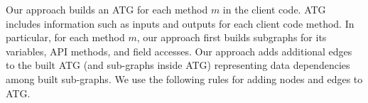 Our approach builds an ATG for each method $m$ in the client code. 
ATG includes information such as inputs 
and outputs for each client code method. In particular, for
each method $m$, our approach first builds subgraphs for its variables,
API methods, and field accesses. Our approach adds additional edges 
to the built ATG (and sub-graphs inside ATG) representing 
data dependencies among built sub-graphs.
We use the following rules for adding nodes and edges to ATG. 


%

